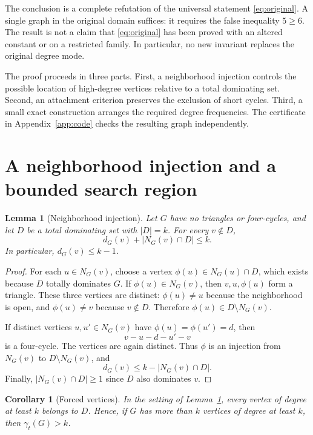 \documentclass[11pt,a4paper]{article}
\newtheorem{lemma}[theorem]{Lemma}
\newtheorem{corollary}[theorem]{Corollary}
\theoremstyle{definition}
\theoremstyle{remark}
\newcommand{\gt}{\gamma_t}
\begin{document}
The conclusion is a complete refutation of the universal statement
\eqref{eq:original}. A single graph in the original domain suffices:
it requires the false inequality $5\ge6$. The result is not a claim
that \eqref{eq:original} has been proved with an altered constant or
on a restricted family. In particular, no new invariant replaces the
original degree mode.

The proof proceeds in three parts. First, a neighborhood injection
controls the possible location of high-degree vertices relative to a
total dominating set. Second, an attachment criterion preserves the
exclusion of short cycles. Third, a small exact construction arranges
the required degree frequencies. The certificate in
Appendix~\ref{app:code} checks the resulting graph independently.

\section{A neighborhood injection and a bounded search region}
\label{sec:injection}

\begin{lemma}[Neighborhood injection]\label{lem:injection}
Let $G$ have no triangles or four-cycles, and let $D$ be a total
dominating set with $|D|=k$. For every $v\notin D$,
\begin{equation}\label{eq:injection}
        d_G(v)+|N_G(v)\cap D|\le k.
\end{equation}
In particular, $d_G(v)\le k-1$.
\end{lemma}

\begin{proof}
For each $u\in N_G(v)$, choose a vertex
$\phi(u)\in N_G(u)\cap D$, which exists because $D$ totally dominates
$G$. If $\phi(u)\in N_G(v)$, then $v,u,\phi(u)$ form a triangle.
These three vertices are distinct: $\phi(u)\ne u$ because the
neighborhood is open, and $\phi(u)\ne v$ because $v\notin D$.
Therefore $\phi(u)\in D\setminus N_G(v)$.

If distinct vertices $u,u'\in N_G(v)$ have
$\phi(u)=\phi(u')=d$, then
\[
                 v-u-d-u'-v
\]
is a four-cycle. The vertices are again distinct. Thus $\phi$ is
an injection from $N_G(v)$ to $D\setminus N_G(v)$, and
\[
             d_G(v)\le k-|N_G(v)\cap D|.
\]
Finally, $|N_G(v)\cap D|\ge1$ since $D$ also dominates $v$.
\end{proof}

\begin{corollary}[Forced vertices]\label{cor:forced}
In the setting of Lemma~\ref{lem:injection}, every vertex of degree
at least $k$ belongs to $D$. Hence, if $G$ has more than $k$ vertices
of degree at least $k$, then $\gt(G)>k$.
\end{corollary}
\end{document}
